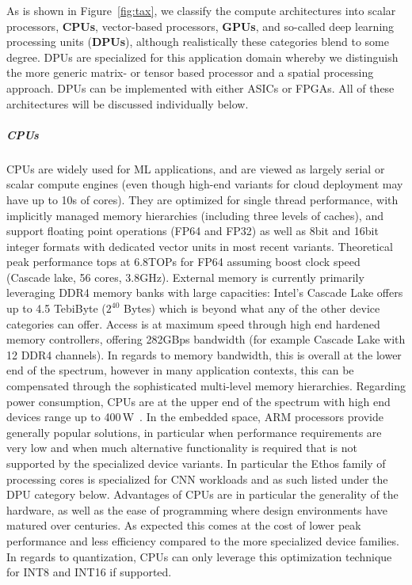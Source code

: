 As is shown in Figure~\ref{fig:tax}, we classify the compute architectures into scalar processors, \textbf{CPUs}, vector-based processors, \textbf{GPUs}, and so-called deep learning processing units (\textbf{DPUs}), although realistically these categories blend to some degree. 
DPUs are specialized for this application domain whereby we distinguish the more generic matrix- or tensor based processor and a spatial processing approach. DPUs can be implemented with either ASICs or FPGAs. All of these architectures will be discussed individually below.

\subparagraph{CPUs} CPUs are widely used for ML applications, and are viewed as largely serial or scalar compute engines (even though high-end variants for cloud deployment may have up to 10s of cores). They are optimized for single thread performance, with implicitly managed memory hierarchies (including three levels of caches), and support floating point operations (FP64 and FP32) as well as 8bit and 16bit integer formats with dedicated vector units in most recent variants. Theoretical peak performance tops at 6.8TOPs for FP64 assuming boost clock speed (Cascade lake, 56 cores, 3.8GHz). External memory is currently primarily leveraging DDR4 memory banks with large capacities: Intel's Cascade Lake offers up to 4.5 TebiByte ($2^{40}$ Bytes) which is beyond what any of the other device categories can offer. Access is at maximum speed through high end hardened memory controllers, offering 282GBps bandwidth (for example Cascade Lake with 12 DDR4 channels). 
In regards to memory bandwidth, this is overall at the lower end of the spectrum, however in many application contexts, this can be compensated through the sophisticated multi-level memory hierarchies.
Regarding power consumption, CPUs are at the upper end of the spectrum with high end devices range up to 400\,W~\cite{cascadelake}.
In the embedded space, ARM processors provide generally popular solutions, in particular when performance requirements are very low and when much alternative functionality is required that is not supported by the specialized device variants. In particular the Ethos family of processing cores is specialized for CNN workloads and as such listed under the DPU category below.
Advantages of CPUs are in particular the generality of the hardware, as well as the ease of programming where design environments have matured over centuries. 
As expected this comes at the cost of lower peak performance and less efficiency compared to the more specialized device families.
In regards to quantization, CPUs can only leverage this optimization technique for INT8 and INT16 if supported.

